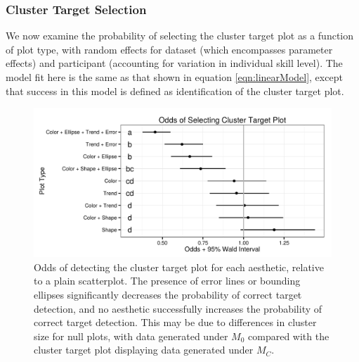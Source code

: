 \documentclass[11pt]{isuthesis}\usepackage[]{graphicx}\usepackage[]{color}
\newenvironment{knitrout}{}{} %
\begin{document}
\subsubsection{Cluster Target Selection}\label{sec:groupModel}


We now examine the probability of selecting the cluster target plot as a function of plot type, with random effects for dataset (which encompasses parameter effects) and participant (accounting for variation in individual skill level). The model fit here is the same as that shown in equation \eqref{eqn:linearModel}, except that success in this model is defined as identification of the cluster target plot. 

\begin{figure}[ht]\centering
\begin{knitrout}
\color{fgcolor}

{\centering \includegraphics[width=.75\linewidth]{Figure/FeatureHierarchy/fig-group-fixef-1} 

}



\end{knitrout}
\caption[Odds of detecting the cluster target plot for each aesthetic]{Odds of detecting the cluster target plot for each aesthetic, relative to a plain scatterplot. The presence of error lines or bounding ellipses significantly decreases the probability of correct target detection, and no aesthetic successfully increases the probability of correct target detection. This may be due to differences in cluster size for null plots, with data generated under $M_0$ compared with the cluster target plot displaying data generated under $M_C$. \label{fig:group.fixef}}
\end{figure}
\end{document}
